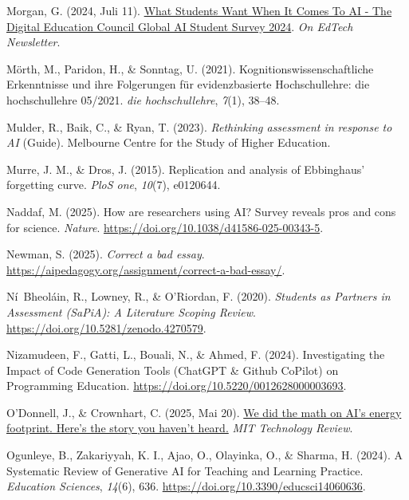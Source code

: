 \documentclass[
  ngerman,
  letterpaper,
  DIV=11]{scrreprt}
\newlength{\cslhangindent}
\newenvironment{CSLReferences}[2] %
 {\begin{list}{}{%
  \setlength{\itemindent}{0pt}
  \setlength{\leftmargin}{0pt}
  \setlength{\parsep}{0pt}
  \ifodd #1
   \setlength{\leftmargin}{\cslhangindent}
   \setlength{\itemindent}{-1\cslhangindent}
  \fi
  \setlength{\itemsep}{#2\baselineskip}}}
 {\end{list}}
\begin{document}
\begin{CSLReferences}{1}{0}
Morgan, G. (2024, Juli 11).
\href{https://onedtech.philhillaa.com/p/what-students-want-when-it-comes-to-ai}{What
Students Want When It Comes To AI - The Digital Education Council Global
AI Student Survey 2024}. \emph{On EdTech Newsletter}.

Mörth, M., Paridon, H., \& Sonntag, U. (2021).
Kognitionswissenschaftliche Erkenntnisse und ihre Folgerungen für
evidenzbasierte Hochschullehre: die hochschullehre 05/2021. \emph{die
hochschullehre}, \emph{7}(1), 38--48.

Mulder, R., Baik, C., \& Ryan, T. (2023). \emph{Rethinking assessment in
response to AI} (Guide). Melbourne Centre for the Study of Higher
Education.

Murre, J. M., \& Dros, J. (2015). Replication and analysis of
Ebbinghaus' forgetting curve. \emph{PloS one}, \emph{10}(7), e0120644.

Naddaf, M. (2025). How are researchers using AI? Survey reveals pros and
cons for science. \emph{Nature}.
\url{https://doi.org/10.1038/d41586-025-00343-5}.

Newman, S. (2025). \emph{Correct a bad essay}.
\url{https://aipedagogy.org/assignment/correct-a-bad-essay/}.

Ní~Bheoláin, R., Lowney, R., \& O'Riordan, F. (2020). \emph{Students as
Partners in Assessment (SaPiA): A Literature Scoping Review}.
\url{https://doi.org/10.5281/zenodo.4270579}.

Nizamudeen, F., Gatti, L., Bouali, N., \& Ahmed, F. (2024).
Investigating the Impact of Code Generation Tools (ChatGPT \& Github
CoPilot) on Programming Education.
\url{https://doi.org/10.5220/0012628000003693}.

O'Donnell, J., \& Crownhart, C. (2025, Mai 20).
\href{https://www.technologyreview.com/2025/05/20/1116327/ai-energy-usage-climate-footprint-big-tech/}{We
did the math on AI's energy footprint. Here's the story you haven't
heard.} \emph{MIT Technology Review}.

Ogunleye, B., Zakariyyah, K. I., Ajao, O., Olayinka, O., \& Sharma, H.
(2024). A Systematic Review of Generative AI for Teaching and Learning
Practice. \emph{Education Sciences}, \emph{14}(6), 636.
\url{https://doi.org/10.3390/educsci14060636}.


\end{CSLReferences}
\end{document}
